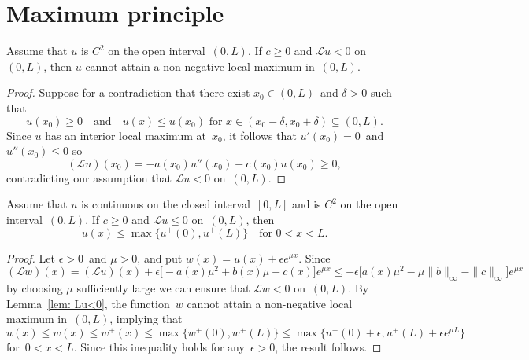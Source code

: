 \section{Maximum principle}

\begin{lemma}\label{lem: Lu<0}
Assume that $u$ is $C^2$ on the open interval~$(0,L)$.
If $c\ge0$ and $\mathcal{L}u<0$ on~$(0,L)$, then $u$ cannot attain a 
non-negative local maximum in~$(0,L)$.
\end{lemma}
\begin{proof}
Suppose for a contradiction that there exist $x_0\in(0,L)$~and $\delta>0$ such
that
\[
u(x_0)\ge0\quad\text{and}\quad
\text{$u(x)\le u(x_0)$ for~$x\in(x_0-\delta,x_0+\delta)\subseteq(0,L)$.}
\]
Since $u$ has an interior local maximum at~$x_0$, it follows that 
$u'(x_0)=0$~and $u''(x_0)\le0$ so 
\[
(\mathcal{L}u)(x_0)=-a(x_0)u''(x_0)+c(x_0)u(x_0)\ge 0,
\]
contradicting our assumption that $\mathcal{L}u<0$ on~$(0,L)$.
\end{proof}

\begin{theorem}
Assume that $u$ is continuous on the closed interval~$[0,L]$ and is $C^2$ on 
the open interval~$(0,L)$. If $c\ge0$ and $\mathcal{L}u\le0$ on~$(0,L)$, then
\[
u(x)\le\max\{u^+(0),u^+(L)\}\quad\text{for $0<x<L$.}
\]
\end{theorem}
\begin{proof}
Let $\epsilon>0$~and $\mu>0$, and put $w(x)=u(x)+\epsilon e^{\mu x}$.  Since
\[
(\mathcal{L}w)(x)
	=(\mathcal{L}u)(x)+\epsilon\bigl[-a(x)\mu^2+b(x)\mu+c(x)\bigr]e^{\mu x}
	\le-\epsilon\bigl[a(x)\mu^2-\mu\|b\|_\infty-\|c\|_\infty\bigr]e^{\mu x}
\]
by choosing $\mu$ sufficiently large we can ensure that $\mathcal{L}w<0$
on~$(0,L)$.  By Lemma~\ref{lem: Lu<0}, the function~$w$ cannot attain a 
non-negative local maximum in~$(0,L)$, implying that 
\[
u(x)\le w(x)\le w^+(x)\le\max\{w^+(0),w^+(L)\}
	\le\max\{u^+(0)+\epsilon,u^+(L)+\epsilon e^{\mu L}\}
\]
for~$0<x<L$.  Since this inequality holds for any~$\epsilon>0$, the result 
follows.
\end{proof}

